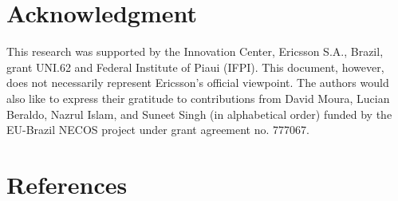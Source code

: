 \documentclass[preprint,10pt,number,5p,twocolumn]{elsarticle}
\begin{document}







\section*{Acknowledgment}
This research was supported by the Innovation Center, Ericsson S.A., Brazil, grant UNI.62 and Federal Institute of Piaui (IFPI). This document, however, does not necessarily represent Ericsson's official viewpoint. The authors would also like to express their gratitude to contributions from David Moura, Lucian Beraldo, Nazrul Islam, and Suneet Singh (in alphabetical order) funded by the EU-Brazil NECOS project under grant agreement no. 777067.

\section*{References}
 

\end{document}
